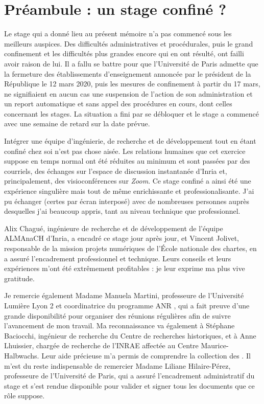 \section*{Préambule : un stage confiné ?}

Le stage qui a donné lieu au présent mémoire n'a pas commencé sous les meilleurs auspices. Des difficultés administratives et procédurales, puis le grand confinement et les difficultés plus grandes encore qui en ont résulté, ont failli avoir raison de lui. Il a fallu se battre pour que l'Université de Paris admette que la fermeture des établissements d'enseignement annoncée par le président de la République le 12 mars 2020, puis les mesures de confinement à partir du 17 mars, ne signifiaient en aucun cas une suspension de l'action de son administration et un report automatique et sans appel des procédures en cours, dont celles concernant les stages. La situation a fini par se débloquer et le stage a commencé avec une semaine de retard sur la date prévue.

Intégrer une équipe d'ingénierie, de recherche et de développement tout en étant confiné chez soi n'est pas chose aisée. Les relations humaines que cet exercice suppose en temps normal ont été réduites au minimum et sont passées par des courriels, des échanges sur l'espace de discussion instantanée d'Inria et, principalement, des visioconférences sur \textit{Zoom}. Ce stage confiné a ainsi été une expérience singulière mais tout de même enrichissante et professionalisante. J'ai pu échanger (certes par écran interposé) avec de nombreuses personnes auprès desquelles j'ai beaucoup appris, tant au niveau technique que professionnel.

Alix Chagué, ingénieure de recherche et de développement de l'équipe ALMAnaCH d'Inria, a encadré ce stage jour après jour, et Vincent Jolivet, responsable de la mission projets numériques de l'École nationale des chartes, en a assuré l'encadrement professionnel et technique. Leurs conseils et leurs expériences m'ont été extrêmement profitables : je leur exprime ma plus vive gratitude.

Je remercie également Madame Manuela Martini, professeure de l'Université Lumière Lyon 2 et coordinatrice du programme ANR \timeus{}, qui a fait preuve d'une grande disponibilité pour organiser des réunions régulières afin de suivre l'avancement de mon travail. Ma reconnaissance va également à Stéphane Baciocchi, ingénieur de recherche du Centre de recherches historiques, et à Anne Lhuissier, chargée de recherche de l'INRAE affectée au Centre Maurice-Halbwachs. Leur aide précieuse m'a permis de comprendre la collection des \odm. Il m'est du reste indispensable de remercier Madame Liliane Hilaire-Pérez, professeure de l'Université de Paris, qui a assuré l'encadrement administratif du stage et s'est rendue disponible pour valider et signer tous les documents que ce rôle suppose.

